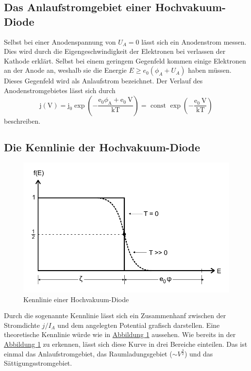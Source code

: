 \subsection{Das Anlaufstromgebiet einer Hochvakuum-Diode}
Selbst bei einer Anodenspannung von $U_A = 0$ lässt sich ein Anodenstrom messen.
Dies wird durch die Eigengeschwindigkeit der Elektronen bei verlassen der Kathode erklärt.
Selbst bei einem geringem Gegenfeld kommen einige Elektronen an der Anode an, weshalb sie die Energie $E \geq e_0 (\phi_A + U_A)$ haben müssen.
Dieses Gegenfeld wird als Anlaufstrom bezeichnet.
Der Verlauf des Anodenstromgebietes lässt sich durch
\begin{equation}
    \mathrm{j}(\mathrm{V})=\mathrm{j}_{0} \exp \left(-\frac{\mathrm{e}_{0} \phi_{\mathrm{A}}+\mathrm{e}_{0} \mathrm{~V}}{\mathrm{kT}}\right)=\text { const } \exp \left(-\frac{\mathrm{e}_{0} \mathrm{~V}}{\mathrm{kT}}\right)
\end{equation}
beschreiben.

\subsection{Die Kennlinie der Hochvakuum-Diode}
\begin{figure}
    \center
    \caption{Kennlinie einer Hochvakuum-Diode}\label{fig:KennlinieTheorie}
    \includegraphics[width=0.5\linewidth]{pictures/KennlinieTheorie.pdf}
\end{figure}
Durch die sogenannte Kennlinie lässt sich ein Zusammenhanf zwischen der Stromdichte $j / I_A$ und dem angelegten Potential
grafisch darstellen.
Eine theoretische Kennlinie würde wie in \hyperref[fig:KennlinieTheorie]{Abbildung \ref{fig:KennlinieTheorie}} aussehen.
Wie bereits in der \hyperref[fig:KennlinieTheorie]{Abbildung \ref{fig:KennlinieTheorie}} zu erkennen, lässt sich diese Kurve in drei Bereiche einteilen.
Das ist einmal das Anlaufstromgebiet, das Raumladungsgebiet ($\sim V^{\frac{3}{2}}$) und das Sättigungsstromgebiet.